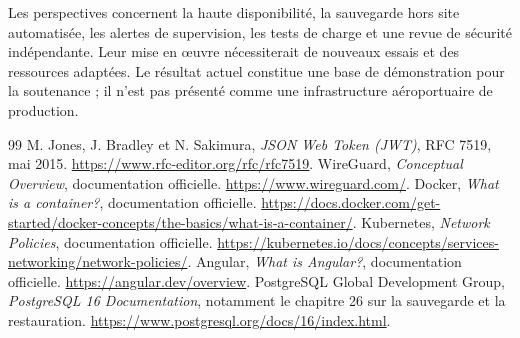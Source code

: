 \documentclass[11pt]{extarticle}
\begin{document}
Les perspectives concernent la haute disponibilité, la sauvegarde hors site automatisée, les alertes de supervision, les tests de charge et une revue de sécurité indépendante. Leur mise en œuvre nécessiterait de nouveaux essais et des ressources adaptées. Le résultat actuel constitue une base de démonstration pour la soutenance ; il n'est pas présenté comme une infrastructure aéroportuaire de production.
\clearpage
{}
\begin{thebibliography}{99}
\small
{} M. Jones, J. Bradley et N. Sakimura, \textit{JSON Web Token (JWT)}, RFC 7519, mai 2015. \url{https://www.rfc-editor.org/rfc/rfc7519}.
 WireGuard, \textit{Conceptual Overview}, documentation officielle. \url{https://www.wireguard.com/}.
 Docker, \textit{What is a container?}, documentation officielle. \url{https://docs.docker.com/get-started/docker-concepts/the-basics/what-is-a-container/}.
 Kubernetes, \textit{Network Policies}, documentation officielle. \url{https://kubernetes.io/docs/concepts/services-networking/network-policies/}.
 Angular, \textit{What is Angular?}, documentation officielle. \url{https://angular.dev/overview}.
 PostgreSQL Global Development Group, \textit{PostgreSQL 16 Documentation}, notamment le chapitre 26 sur la sauvegarde et la restauration. \url{https://www.postgresql.org/docs/16/index.html}.
\end{thebibliography}
\end{document}

